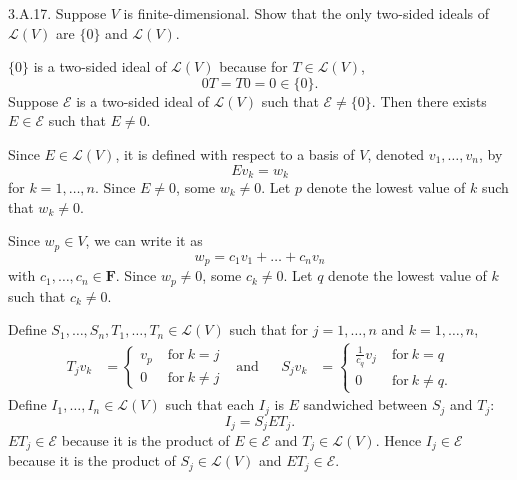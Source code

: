 \documentclass[a5paper]{article}
\begin{document}
\newcommand   \C           {\mathbf{C}}
\newcommand   \R           {\mathbf{R}}
\renewcommand \L           {\mathcal{L}}
\newcommand   \F           {\mathbf{F}}
\renewcommand \P           {\mathcal{P}}
\newcommand   \M           {\mathcal{M}}
\newcommand   \op          {\operatorname}
\newcommand \E             {\mathcal{E}}

    3.A.17.
    Suppose $V$ is finite-dimensional.
    Show that the only two-sided ideals of $\L(V)$ are $\{0\}$ and $\L(V)$.

    $\{0\}$ is a two-sided ideal of $\L(V)$ because for $T \in \L(V)$,
\begin{equation*}
        0T = T0 = 0 \in \{0\} .
\end{equation*}
    Suppose $\E$ is a two-sided ideal of $\L(V)$ such that $\E \neq \{0\}$.
    Then there exists $E \in \E$ such that $E \neq 0$.

    Since $E \in \L(V)$, it is defined with respect to a basis of $V$, denoted $v_1,\dots,v_n$, by
\begin{equation*}
        Ev_k = w_k
\end{equation*}
    for $k = 1,\dots,n$.
    Since $E \neq 0$, some $w_k \neq 0$.
    Let $p$ denote the lowest value of $k$ such that $w_k \neq 0$.

    Since $w_p \in V$, we can write it as
\begin{equation*}
        w_p = c_1v_1 + \dots + c_nv_n
\end{equation*}
    with $c_1,\dots,c_n \in \F$.
    Since $w_p \neq 0$, some $c_k \neq 0$.
    Let $q$ denote the lowest value of $k$ such that $c_k \neq 0$.

    Define $S_1,\dots,S_n,T_1,\dots,T_n \in \L(V)$ such that for $j=1,\dots,n$ and $k=1,\dots,n$,
\begin{align*}
        T_jv_k &=
            \begin{cases}
                v_p               \; &\text{for}\ k =    j\\
                0                 \; &\text{for}\ k \neq j
            \end{cases} &\text{and}& &
        S_jv_k &=
            \begin{cases}
                \frac{1}{c_q} v_j \; &\text{for}\ k =    q\\
                0                 \; &\text{for}\ k \neq q .
            \end{cases}
\end{align*}
    Define $I_1,\dots,I_n \in \L(V)$ such that each $I_j$ is $E$ sandwiched between $S_j$ and $T_j$:
\begin{equation*}
        I_j = S_jET_j .
\end{equation*}
    $ET_j \in \E$ because it is the product of $E \in \E$ and $T_j \in \L(V)$.
    Hence $I_j \in \E$ because it is the product of $S_j \in \L(V)$ and $ET_j \in \E$.
\end{document}
